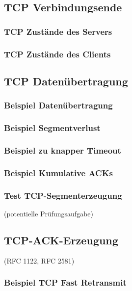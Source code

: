 \subsection{TCP Verbindungsende}
\subsubsection{TCP Zustände des Servers}
\subsubsection{TCP Zustände des Clients}

\subsection{TCP Datenübertragung}
\subsubsection{Beispiel Datenübertragung}
\subsubsection{Beispiel Segmentverlust}
\subsubsection{Beispiel zu knapper Timeout}
\subsubsection{Beispiel Kumulative ACKs}

\subsubsection{Test TCP-Segmenterzeugung}
(potentielle Prüfungsaufgabe)

\subsection{TCP-ACK-Erzeugung}
(RFC 1122, RFC 2581)
\subsubsection{Beispiel TCP Fast Retransmit}

